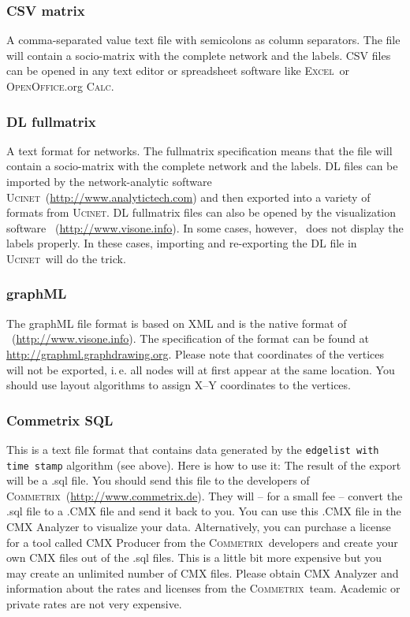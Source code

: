 \documentclass[12pt,a4paper]{scrreprt}
\newcommand{\visonecolor}
{\textsf%
 {\protect\raisebox{.5ex}{\color[rgb]{1,0,0}v}%
  \protect\raisebox{.1ex}{\color[rgb]{0,1,0}i}%
  \protect\raisebox{-.1ex}{\color[rgb]{0,0,1}s}%
  \protect\raisebox{.1ex}{\color[rgb]{1,0.8,0}o}%
  \protect\raisebox{-.1ex}{\color[rgb]{1,0,0.8}n}%
  \protect\raisebox{-.4ex}{\color[rgb]{0,0.8,0.8}e}%
 }%
}
\newcommand{\ucinet}{\textsc{Ucinet}}
\newcommand{\excel}{\textsc{Excel}}
\newcommand{\calc}{\textsc{OpenOffice}.org \textsc{Calc}}
\newcommand{\commetrix}{\textsc{Commetrix}}
\newcommand{\code}[1]{\texttt{#1}}
\begin{document}
\subsubsection{CSV matrix}
A comma-separated value text file with semicolons as column separators. The file will contain a socio-matrix with the complete network and the labels. CSV files can be opened in any text editor or spreadsheet software like \excel\ or \calc.

\subsubsection{DL fullmatrix}
A text format for networks. The fullmatrix specification means that the file will contain a socio-matrix with the complete network and the labels. DL files can be imported by the network-analytic software \ucinet\ (\url{http://www.analytictech.com}) and then exported into a variety of formats from \ucinet. DL fullmatrix files can also be opened by the visualization software \visonecolor\ (\url{http://www.visone.info}). In some cases, however, \visonecolor\ does not display the labels properly. In these cases, importing and re-exporting the DL file in \ucinet\ will do the trick.

\subsubsection{graphML}
The graphML file format is based on XML and is the native format of \visonecolor\ (\url{http://www.visone.info}). The specification of the format can be found at \url{http://graphml.graphdrawing.org}. Please note that coordinates of the vertices will not be exported, i.\,e. all nodes will at first appear at the same location. You should use layout algorithms to assign X--Y coordinates to the vertices.

\subsubsection{Commetrix SQL}\label{cmx}
This is a text file format that contains data generated by the \code{edgelist with time stamp} algorithm (see above). Here is how to use it: The result of the export will be a .sql file. You should send this file to the developers of \commetrix\ (\url{http://www.commetrix.de}). They will -- for a small fee -- convert the .sql file to a .CMX file and send it back to you. You can use this .CMX file in the CMX Analyzer to visualize your data. Alternatively, you can purchase a license for a tool called CMX Producer from the \commetrix\ developers and create your own CMX files out of the .sql files. This is a little bit more expensive but you may create an unlimited number of CMX files. Please obtain CMX Analyzer and information about the rates and licenses from the \commetrix\ team. Academic or private rates are not very expensive.
\end{document}
